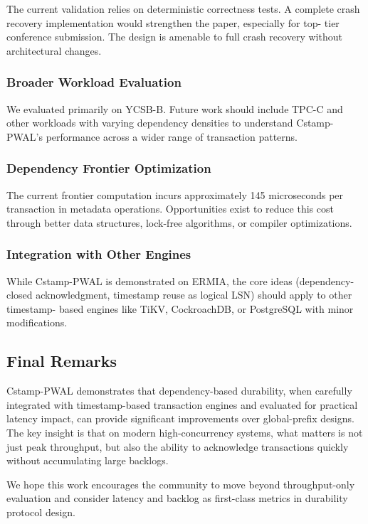 The current validation relies on deterministic correctness tests.  A complete
crash recovery implementation would strengthen the paper, especially for top-
tier conference submission.  The design is amenable to full crash recovery
without architectural changes.

\subsubsection{Broader Workload Evaluation}

We evaluated primarily on YCSB-B.  Future work should include TPC-C and other
workloads with varying dependency densities to understand Cstamp-PWAL's
performance across a wider range of transaction patterns.

\subsubsection{Dependency Frontier Optimization}

The current frontier computation incurs approximately 145 microseconds per
transaction in metadata operations.  Opportunities exist to reduce this cost
through better data structures, lock-free algorithms, or compiler optimizations.

\subsubsection{Integration with Other Engines}

While Cstamp-PWAL is demonstrated on ERMIA, the core ideas (dependency-closed
acknowledgment, timestamp reuse as logical LSN) should apply to other timestamp-
based engines like TiKV, CockroachDB, or PostgreSQL with minor modifications.

\subsection{Final Remarks}

Cstamp-PWAL demonstrates that dependency-based durability, when carefully
integrated with timestamp-based transaction engines and evaluated for practical
latency impact, can provide significant improvements over global-prefix designs.
The key insight is that on modern high-concurrency systems, what matters is not
just peak throughput, but also the ability to acknowledge transactions quickly
without accumulating large backlogs.

We hope this work encourages the community to move beyond throughput-only
evaluation and consider latency and backlog as first-class metrics in durability
protocol design.

